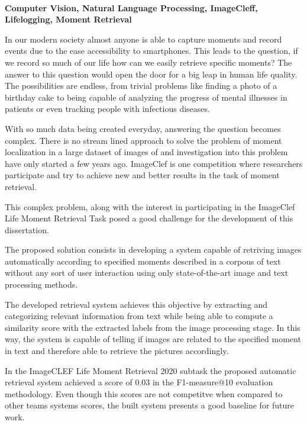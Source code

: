 \EndTitlePage
\titlepage\ \endtitlepage %

\TitlePage
  \vspace*{55mm}
       {\textbf{Computer Vision, Natural Language Processing, ImageCleff, Lifelogging, Moment Retrieval}}

     {In our modern society almost anyone is able to capture moments and record events due to the ease accessibility to smartphones. This leads to the question, if we record so much of our life how can we easily retrieve specific moments? The answer to this question would open the door for a big leap in human life quality. The possibilities are endless, from trivial problems like finding a photo of a birthday cake to being capable of analyzing the progress of mental illnesses in patients or even tracking people with infectious diseases.}

     \TEXT{}
     {With so much data being created everyday, answering the question becomes complex. There is no stream lined approach to solve the problem of moment localization in a large dataset of images of and investigation into this problem have only started a few years ago. ImageClef is one competition where researchers participate and try to achieve new and better results in the task of moment retrieval.}

     \TEXT{}
     {This complex problem, along with the interest in participating in the ImageClef Life Moment Retrieval Task posed a good challenge for the development of this dissertation.}

     \TEXT{}
     {The proposed solution consists in developing a system capable of retriving images automatically  according to specified moments described in a corpous of text without any sort of user interaction using only state-of-the-art image and text processing methods.}

     \TEXT{}
     {The developed retrieval system achieves this objective by extracting and categorizing relevant information from text while being able to compute a similarity score with the extracted labels from the image processing stage. In this way, the system is capable of telling if images are related to the specified moment in text and therefore able to retrieve the pictures accordingly.}

     \TEXT{}
     {In the ImageCLEF Life Moment Retrieval 2020 subtask the proposed automatic retrieval system achieved a score of 0.03 in the F1-measure@10 evaluation methodology. Even though this scores are not competitve when compared to other teams systems scores, the built system presents a good baseline for future work. }

\EndTitlePage
\titlepage\ \endtitlepage %
